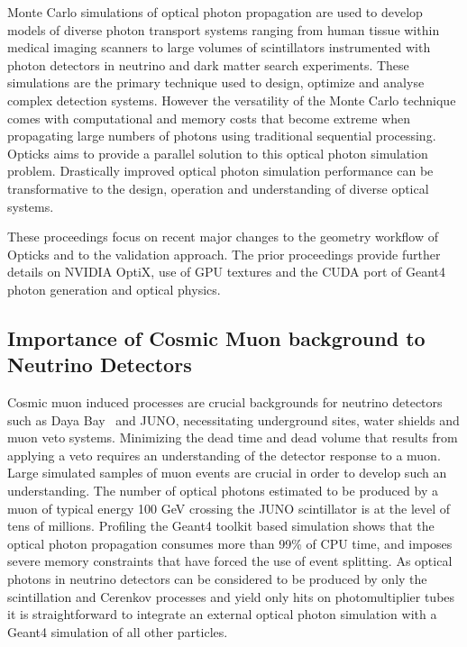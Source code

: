 \documentclass{webofc}
\begin{document}
Monte Carlo simulations of optical photon propagation 
are used to develop models of diverse photon transport systems 
ranging from human tissue within medical imaging scanners 
to large volumes of scintillators instrumented with photon detectors in neutrino 
and dark matter search experiments. 
These simulations are the primary technique used to design, optimize 
and analyse complex detection systems. However the versatility 
of the Monte Carlo technique comes with computational and memory costs 
that become extreme when propagating large numbers of photons
using traditional sequential processing. Opticks aims to provide a 
parallel solution to this optical photon simulation problem.  Drastically 
improved optical photon simulation performance can be transformative 
to the design, operation and understanding of diverse optical systems.

These proceedings focus on recent major changes to the geometry workflow of Opticks 
and to the validation approach. The prior proceedings\cite{chep2016} provide further
details on NVIDIA OptiX, use of GPU textures and the CUDA port of Geant4 photon generation 
and optical physics.
%
\subsection{Importance of Cosmic Muon background to Neutrino Detectors}
%
Cosmic muon induced processes are crucial backgrounds for neutrino
detectors such as Daya Bay~\cite{dyb} and JUNO\cite{juno},
necessitating underground sites, water shields and muon veto systems.
Minimizing the dead time and dead volume that results from applying
a veto requires an understanding of the detector response to a muon.
Large simulated samples of muon events are crucial in order to
develop such an understanding.
%
The number of optical photons estimated to be produced by a muon of
typical energy 100 GeV crossing the JUNO scintillator is at the level of tens of millions.
Profiling the Geant4 toolkit based simulation shows that the optical photon propagation 
consumes more than 99\% of CPU time, and imposes severe memory constraints that have forced
the use of event splitting.  
%
As optical photons in neutrino detectors can be considered to be produced
by only the scintillation and Cerenkov processes and yield only hits
on photomultiplier tubes it is straightforward to integrate an
external optical photon simulation with a Geant4 simulation of all other particles.
%
\end{document}
